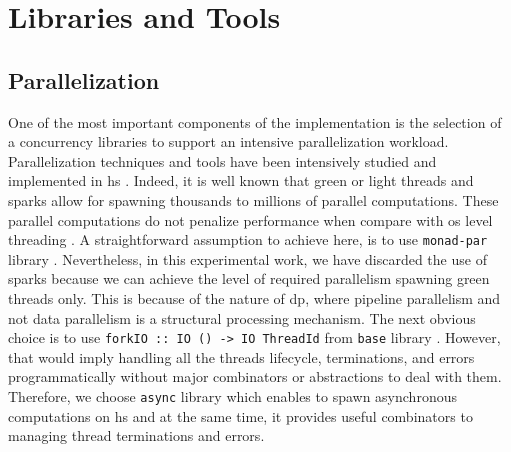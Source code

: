 \section{Libraries and Tools}
\subsection{Parallelization} 
One of the most important components of the implementation is the selection of a concurrency libraries to support an intensive parallelization workload. Parallelization techniques and tools have been intensively studied and implemented in \acrshort{hs} \cite{monadpar}. Indeed, it is well known that green or light threads and sparks allow for spawning thousands to millions of parallel computations. These parallel computations do not penalize performance when compare with \acrfull{os} level threading \cite{parallelbook}. 
A straightforward assumption to achieve here, is to use \texttt{monad-par} library \cite{monadparlib, monadpar}. Nevertheless, in this experimental work, we have discarded the use of sparks \cite{sparks} because we can achieve the level of required parallelism spawning green threads only. This is because of the nature of \acrshort{dp}, where pipeline parallelism and not data parallelism is a structural processing mechanism. The next obvious choice is to use \texttt{forkIO :: IO () -> IO ThreadId} from \texttt{base} library \cite{forkio}. 
However, that would imply handling all the threads lifecycle, terminations, and errors programmatically without major combinators or abstractions to deal with them. 
Therefore, we choose \texttt{async} library \cite{async}  which enables to spawn asynchronous computations \cite{parallelbook} on \acrshort{hs} and at the same time, it provides useful combinators to managing thread terminations and errors.

